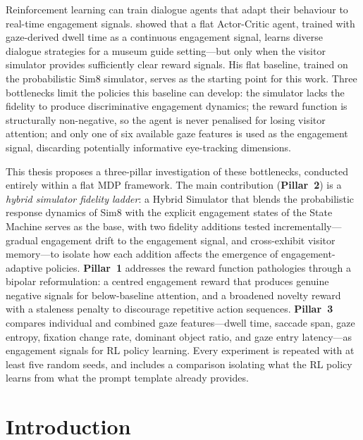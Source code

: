 \documentclass[a4paper, 11pt]{article}
\newcommand{\pillar}[1]{\textbf{Pillar~#1}}
\begin{document}
Reinforcement learning can train dialogue agents that adapt their behaviour to real-time engagement signals. \citet{bourdon2024thesis} showed that a flat Actor-Critic agent, trained with gaze-derived dwell time as a continuous engagement signal, learns diverse dialogue strategies for a museum guide setting---but only when the visitor simulator provides sufficiently clear reward signals. His flat baseline, trained on the probabilistic Sim8 simulator, serves as the starting point for this work. Three bottlenecks limit the policies this baseline can develop: the simulator lacks the fidelity to produce discriminative engagement dynamics; the reward function is structurally non-negative, so the agent is never penalised for losing visitor attention; and only one of six available gaze features is used as the engagement signal, discarding potentially informative eye-tracking dimensions.

This thesis proposes a three-pillar investigation of these bottlenecks, conducted entirely within a flat MDP framework. The main contribution (\pillar{2}) is a \emph{hybrid simulator fidelity ladder}: a Hybrid Simulator that blends the probabilistic response dynamics of Sim8 with the explicit engagement states of the State Machine serves as the base, with two fidelity additions tested incrementally---gradual engagement drift to the engagement signal, and cross-exhibit visitor memory---to isolate how each addition affects the emergence of engagement-adaptive policies. \pillar{1} addresses the reward function pathologies through a bipolar reformulation: a centred engagement reward that produces genuine negative signals for below-baseline attention, and a broadened novelty reward with a staleness penalty to discourage repetitive action sequences. \pillar{3} compares individual and combined gaze features---dwell time, saccade span, gaze entropy, fixation change rate, dominant object ratio, and gaze entry latency---as engagement signals for RL policy learning. Every experiment is repeated with at least five random seeds, and includes a comparison isolating what the RL policy learns from what the prompt template already provides.

\newpage
\tableofcontents
\newpage

\section{Introduction}
\label{sec:introduction}
\end{document}
